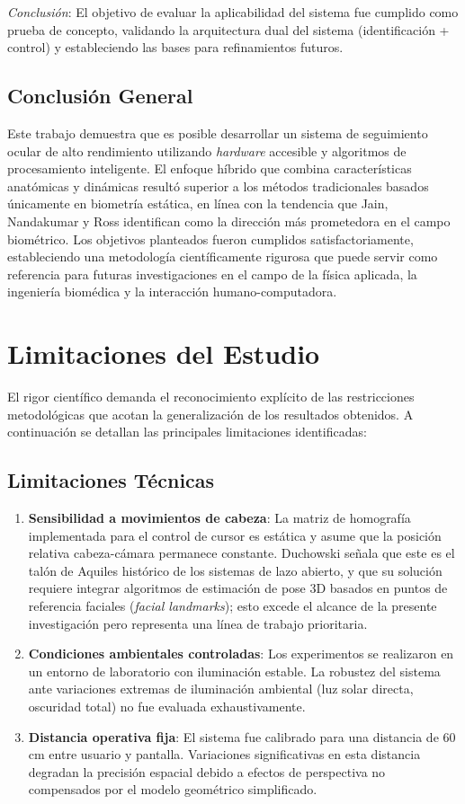 \textit{Conclusión}: El objetivo de evaluar la aplicabilidad del sistema fue cumplido como prueba de concepto, validando la arquitectura dual del sistema (identificación + control) y estableciendo las bases para refinamientos futuros.
\subsection{Conclusión General}

Este trabajo demuestra que es posible desarrollar un sistema de seguimiento ocular de alto rendimiento utilizando \textit{hardware} accesible y algoritmos de procesamiento inteligente.
El enfoque híbrido que combina características anatómicas y dinámicas resultó superior a los métodos tradicionales basados únicamente en biometría estática, en línea con la tendencia que Jain, Nandakumar y Ross \cite{jain2016biometric} identifican como la dirección más prometedora en el campo biométrico.
Los objetivos planteados fueron cumplidos satisfactoriamente, estableciendo una metodología científicamente rigurosa que puede servir como referencia para futuras investigaciones en el campo de la física aplicada, la ingeniería biomédica y la interacción humano-computadora.
\section{Limitaciones del Estudio}

El rigor científico demanda el reconocimiento explícito de las restricciones metodológicas que acotan la generalización de los resultados obtenidos.
A continuación se detallan las principales limitaciones identificadas:

\subsection{Limitaciones Técnicas}

\begin{enumerate}
	\item \textbf{Sensibilidad a movimientos de cabeza}: La matriz de homografía implementada para el control de cursor es estática y asume que la posición relativa cabeza-cámara permanece constante.
	Duchowski \cite{duchowski2017} señala que este es el talón de Aquiles histórico de los sistemas de lazo abierto, y que su solución requiere integrar algoritmos de estimación de pose 3D basados en puntos de referencia faciales (\textit{facial landmarks});
	esto excede el alcance de la presente investigación pero representa una línea de trabajo prioritaria.
	\item \textbf{Condiciones ambientales controladas}: Los experimentos se realizaron en un entorno de laboratorio con iluminación estable.
	La robustez del sistema ante variaciones extremas de iluminación ambiental (luz solar directa, oscuridad total) no fue evaluada exhaustivamente.
	\item \textbf{Distancia operativa fija}: El sistema fue calibrado para una distancia de 60 cm entre usuario y pantalla.
	Variaciones significativas en esta distancia degradan la precisión espacial debido a efectos de perspectiva no compensados por el modelo geométrico simplificado.
\end{enumerate}

